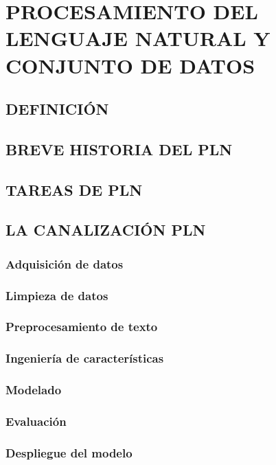 \chapter{PROCESAMIENTO DEL LENGUAJE NATURAL Y CONJUNTO DE DATOS}\label{chp-controlIoT}

\section{DEFINICIÓN}

\section{BREVE HISTORIA DEL PLN}

\section{TAREAS DE PLN}

\section{LA CANALIZACIÓN PLN}

\subsection{Adquisición de datos}

\subsection{Limpieza de datos}

\subsection{Preprocesamiento de texto}

\subsection{Ingeniería de características}

\subsection{Modelado}

\subsection{Evaluación}

\subsection{Despliegue del modelo}

